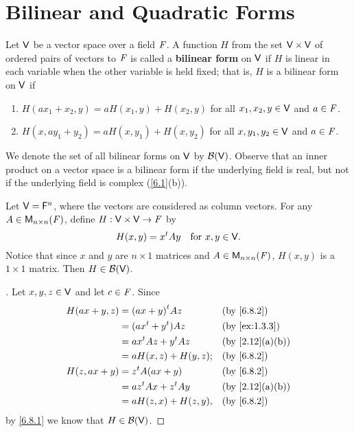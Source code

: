 \section{Bilinear and Quadratic Forms}\label{sec:6.8}

\begin{defn}\label{6.8.1}
  Let \(\mathsf{V}\) be a vector space over a field \(\mathit{F}\).
  A function \(H\) from the set \(\mathsf{V} \times \mathsf{V}\) of ordered pairs of vectors to \(\mathit{F}\) is called a \textbf{bilinear form} on \(\mathsf{V}\) if \(H\) is linear in each variable when the other variable is held fixed;
  that is, \(H\) is a bilinear form on \(\mathsf{V}\) if
  \begin{enumerate}
    \item \(H(a x_1 + x_2, y) = a H(x_1, y) + H(x_2, y)\) for all \(x_1, x_2, y \in \mathsf{V}\) and \(a \in \mathit{F}\).
    \item \(H(x, a y_1 + y_2) = a H(x, y_1) + H(x, y_2)\) for all \(x, y_1, y_2 \in \mathsf{V}\) and \(a \in \mathit{F}\).
  \end{enumerate}
  We denote the set of all bilinear forms on \(\mathsf{V}\) by \(\mathcal{B}(\mathsf{V})\).
  Observe that an inner product on a vector space is a bilinear form if the underlying field is real, but not if the underlying field is complex (\cref{6.1}(b)).
\end{defn}

\begin{eg}\label{6.8.2}
  Let \(\mathsf{V} = \mathsf{F}^n\), where the vectors are considered as column vectors.
  For any \(A \in \ms[n][n][\F]\), define \(H : \mathsf{V} \times \mathsf{V} \to \mathit{F}\) by
  \[
    H(x, y) = {x}^{t} A y \quad \text{for } x, y \in \mathsf{V}.
  \]
  Notice that since \(x\) and \(y\) are \(n \times 1\) matrices and \(A \in \ms[n][n][\F]\), \(H(x, y)\) is a \(1 \times 1\) matrix.
  Then \(H \in \mathcal{B}(\mathsf{V})\).
\end{eg}

\begin{proof}[]
  Let \(x, y, z \in \mathsf{V}\) and let \(c \in \mathit{F}\).
  Since
  \begin{align*}
    H(ax + y, z) & = \tp{(ax + y)} A z         &  & \by{6.8.2}     \\
                 & = (a \tp{x} + \tp{y}) A z   &  & \by{ex:1.3.3}  \\
                 & = a \tp{x} A z + \tp{y} A z &  & \by{2.12}[a,b] \\
                 & = a H(x, z) + H(y, z);      &  & \by{6.8.2}     \\
    H(z, ax + y) & = \tp{z} A (ax + y)         &  & \by{6.8.2}     \\
                 & = a \tp{z} A x + \tp{z} A y &  & \by{2.12}[a,b] \\
                 & = a H(z, x) + H(z, y),      &  & \by{6.8.2}
  \end{align*}
  by \cref{6.8.1} we know that \(H \in \mathcal{B}(\mathsf{V})\).
\end{proof}

